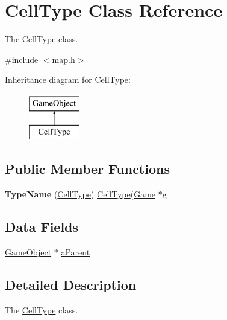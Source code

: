 \hypertarget{class_cell_type}{\section{\-Cell\-Type \-Class \-Reference}
\label{class_cell_type}
}


\-The \hyperlink{class_cell_type}{\-Cell\-Type} class.  




{\ttfamily \#include $<$map.\-h$>$}

\-Inheritance diagram for \-Cell\-Type\-:\begin{figure}[H]
\begin{center}
\leavevmode
\includegraphics[height=2.000000cm]{class_cell_type}
\end{center}
\end{figure}
\subsection*{\-Public \-Member \-Functions}
\begin{DoxyCompactItemize}
\item 
\hypertarget{class_cell_type_a3c4066c46897dfc3e52eb454bd017dba}{{\bfseries \-Type\-Name} (\hyperlink{class_cell_type}{\-Cell\-Type}) \hyperlink{class_cell_type}{\-Cell\-Type}(\hyperlink{class_game}{\-Game} $\ast$g}\label{class_cell_type_a3c4066c46897dfc3e52eb454bd017dba}

\end{DoxyCompactItemize}
\subsection*{\-Data \-Fields}
\begin{DoxyCompactItemize}
\item 
\hyperlink{class_game_object}{\-Game\-Object} $\ast$ \hyperlink{class_cell_type_a7ac20d29216624b54218a54bde6593f2}{a\-Parent}
\end{DoxyCompactItemize}


\subsection{\-Detailed \-Description}
\-The \hyperlink{class_cell_type}{\-Cell\-Type} class. 

